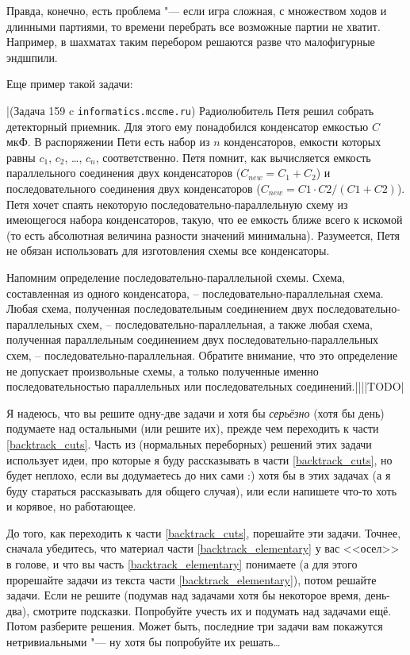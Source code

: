 Правда, конечно, есть проблема "--- если игра сложная, с множеством ходов и длинными партиями, то времени перебрать
все возможные партии не хватит. Например, в шахматах таким перебором решаются разве что малофигурные эндшпили.

Еще пример такой задачи:

\task|(Задача 159 c \verb`informatics.mccme.ru`) Радиолюбитель Петя решил собрать детекторный приемник. 
Для этого ему понадобился конденсатор емкостью $C$ мкФ. 
В распоряжении Пети есть набор из $n$ конденсаторов, емкости которых равны $c_1$, $c_2$, \dots, $c_n$, соответственно. 
Петя помнит, как вычисляется емкость параллельного соединения двух конденсаторов ($C_{new} = C_1 + C_2$) 
и последовательного соединения двух конденсаторов ($C_{new} = C1\cdot C2/(C1+C2)$). 
Петя хочет спаять некоторую последовательно-параллельную схему из имеющегося набора конденсаторов, такую, 
что ее емкость ближе всего к искомой (то есть абсолютная величина разности значений минимальна). 
Разумеется, Петя не обязан использовать для изготовления схемы все конденсаторы.

Напомним определение последовательно-параллельной схемы. Схема, составленная из одного конденсатора, – последовательно-параллельная схема. 
Любая схема, полученная последовательным соединением двух последовательно-параллельных схем, – последовательно-параллельная, 
а также любая схема, полученная параллельным соединением двух последовательно-параллельных схем, – последовательно-параллельная. 
Обратите внимание, что это определение не допускает произвольные схемы, 
а только полученные именно последовательностью параллельных или последовательных соединений.||||TODO|

Я надеюсь, что вы решите одну-две задачи и хотя бы \textit{серьёзно} (хотя бы день) 
подумаете над остальными (или решите их), прежде чем переходить к части \ref{backtrack_cuts}.
Часть из (нормальных переборных) решений этих задачи использует идеи, про которые я буду 
рассказывать в части \ref{backtrack_cuts}, но будет неплохо, если вы додумаетесь до них сами :) хотя бы в этих 
задачах (а я буду стараться рассказывать для общего случая), или если напишете что-то хоть и 
корявое, но работающее.

До того, как переходить к части \ref{backtrack_cuts}, порешайте эти задачи. Точнее, сначала убедитесь, что 
материал части \ref{backtrack_elementary} у вас <<осел>> в голове, и что вы часть \ref{backtrack_elementary} понимаете (а для этого прорешайте 
задачи из текста части \ref{backtrack_elementary}), потом решайте задачи. Если не решите (подумав над задачами хотя бы 
некоторое время, день-два), смотрите подсказки. Попробуйте учесть их и подумать 
над задачами ещё. Потом разберите решения. Может быть, последние три задачи вам 
покажутся нетривиальными "--- ну хотя бы попробуйте их решать\dots


